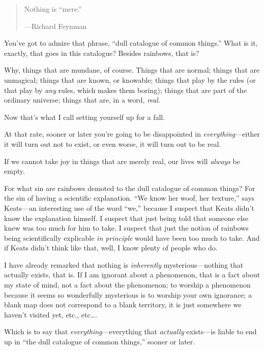 \begin{quote}
{
 Nothing is ``mere.''}

{\raggedleft
 {}---Richard Feynman
\par}
\end{quote}


{
 You've got to admire that phrase,
``dull catalogue of common things.''
What is it, exactly, that goes in this catalogue? Besides rainbows,
that is?}

{
 Why, things that are mundane, of course. Things that are normal;
things that are unmagical; things that are known, or knowable; things
that play by the rules (or that play by \textit{any} rules, which makes
them boring); things that are part of the ordinary universe; things
that are, in a word, \textit{real.}}

{
 Now that's what I call setting yourself up for a
fall.}

{
 At that rate, sooner or later you're going to be
disappointed in \textit{everything}{}---either it will turn out not to
exist, or even worse, it will turn out to be real.}

{
 If we cannot take joy in things that are merely real, our lives
will \textit{always} be empty.}

{
 For what sin are rainbows demoted to the dull catalogue of common
things? For the sin of having a scientific explanation.
``We know her woof, her texture,''
says Keats---an interesting use of the word
``we,'' because I suspect that Keats
didn't know the explanation himself. I suspect that
just being told that someone else knew was too much for him to take. I
suspect that just the notion of rainbows being scientifically
explicable \textit{in principle} would have been too much to take. And
if Keats didn't think like that, well, I know plenty of
people who do.}

{
 I have already remarked that nothing is \textit{inherently}
mysterious---nothing that actually exists, that is. If I am ignorant
about a phenomenon, that is a fact about my state of mind, not a fact
about the phenomenon; to worship a phenomenon because it seems so
wonderfully mysterious is to worship your own ignorance; a blank map
does not correspond to a blank territory, it is just somewhere we
haven't visited yet, etc., etc\ldots.}

{
 Which is to say that \textit{everything}{}---everything that
\textit{actually} exists---is liable to end up in
``the dull catalogue of common
things,'' sooner or later.}

